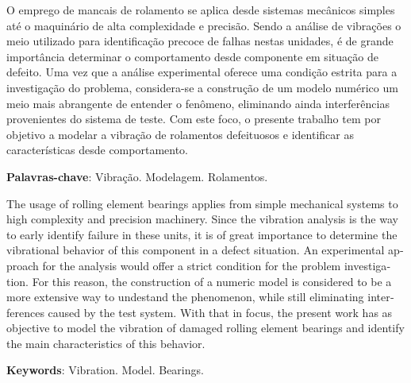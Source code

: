 \imprimircapa
\imprimirfolhaderosto
\clearpage


%	

\begin{resumo}
	\SingleSpacing
	O emprego de mancais de rolamento se aplica desde sistemas mecânicos simples até o maquinário de alta complexidade e precisão.
	Sendo a análise de vibrações o meio utilizado para identificação precoce de falhas nestas unidades, é de grande importância determinar o comportamento desde componente em situação de defeito.
	Uma vez que a análise experimental oferece uma condição estrita para a investigação do problema, considera-se a construção de um modelo numérico um meio mais abrangente de entender o fenômeno, eliminando ainda interferências provenientes do sistema de teste.
	Com este foco, o presente trabalho tem por objetivo a modelar a vibração de rolamentos defeituosos e identificar as características desde comportamento.
	\vspace{\onelineskip}
	
	\noindent
	\textbf{Palavras-chave}: Vibração. Modelagem. Rolamentos.
\end{resumo}

\begin{resumo}
	\SingleSpacing
	\begin{otherlanguage}{english}
		The usage of rolling element bearings applies from simple mechanical systems to high complexity and precision machinery.
		Since the vibration analysis is the way to early identify failure in these units, it is of great importance to determine the vibrational behavior of this component in a defect situation.
		An experimental approach for the analysis would offer a strict condition for the problem investigation.
		For this reason, the construction of a numeric model is considered to be a more extensive way to undestand the phenomenon, while still eliminating interferences caused by the test system.
		With that in focus, the present work has as objective to model the vibration of damaged rolling element bearings and identify the main characteristics of this behavior.
		\vspace{\onelineskip}
		
		\noindent
		\textbf{Keywords}: Vibration. Model. Bearings.
	\end{otherlanguage}
\end{resumo}

\listoffigures*
\cleardoublepage

\listofquadros*
\cleardoublepage


\listofsiglas*
\cleardoublepage

\listofsimbolos*
\cleardoublepage

\tableofcontents*
\cleardoublepage
